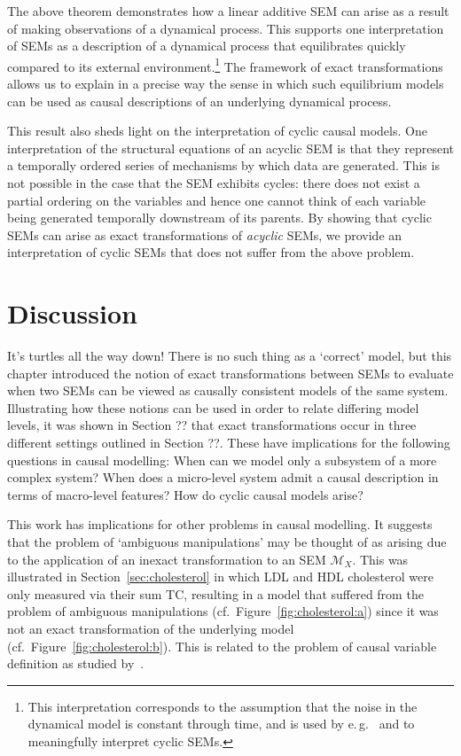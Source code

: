 The above theorem demonstrates how a linear additive SEM can arise as a result of making observations of a dynamical process.
This supports one interpretation of SEMs as a description of a dynamical process that equilibrates quickly compared to its external environment.\footnote{This interpretation corresponds to the assumption that the noise in the dynamical model is constant through time, and is used by e.\,g.\ \cite{lacerda2012discovering,Mooij_et_al_NIPS_11,hyttinen2012learning,mooij2013ode} and \cite{mooij2013cyclic} to meaningfully interpret cyclic SEMs.}
The framework of exact transformations allows us to explain in a precise way the sense in which such equilibrium models can be used as causal descriptions of an underlying dynamical process.

This result also sheds light on the interpretation of cyclic causal models.
One interpretation of the structural equations of an acyclic SEM is that they represent a temporally ordered series of mechanisms by which data are generated.
This is not possible in the case that the SEM exhibits cycles: there does not exist a partial ordering on the variables and hence one cannot think of each variable being generated temporally downstream of its parents.
By showing that cyclic SEMs can arise as exact transformations of \emph{acyclic} SEMs, we provide an interpretation of cyclic SEMs that does not suffer from the above problem.




\section{Discussion}

It's turtles all the way down!
There is no such thing as a `correct' model, but this chapter introduced the notion of exact transformations between SEMs to evaluate when two SEMs can be viewed as causally consistent models of the same system.
Illustrating how these notions can be used in order to relate differing model levels, it was shown in Section ?? that exact transformations occur in three different settings outlined in Section ??.
These have implications for the following questions in causal modelling: When can we model only a subsystem of a more complex system? When does a micro-level system admit a causal description in terms of macro-level features? How do cyclic causal models arise?

This work has implications for other problems in causal modelling.
It suggests that the problem of `ambiguous manipulations' \citep{spirtes2004causal} may be thought of as arising due to the application of an inexact transformation to an SEM $\mathcal{M}_X$.
This was illustrated in Section~\ref{sec:cholesterol} in which LDL and HDL cholesterol were only measured via their sum TC, resulting in a model that suffered from the problem of ambiguous manipulations (cf.\ Figure~\ref{fig:cholesterol:a}) since it was not an exact transformation of the underlying model (cf.\ Figure~\ref{fig:cholesterol:b}).
This is related to the problem of causal variable definition as studied by~\cite{eberhardt2016green}.

